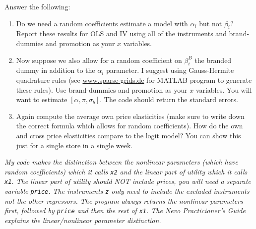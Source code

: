 \documentclass[11pt,letterpaper]{article}
\begin{document}
\noindent Answer the following:
\begin{enumerate}
\item Do we need a random coefficients estimate a model with $\alpha_i$ but not $\beta_i$? Report these results for OLS and IV using all of the instruments and brand-dummies and promotion as your $x$ variables.
\item Now suppose we also allow for a random coefficient on $\beta_i^{B}$ the branded dummy in addition to the $\alpha_i$ parameter. I suggest using Gauss-Hermite quadrature rules (see \url{www.sparse-grids.de} for MATLAB program to generate these rules). Use brand-dummies and promotion as your $x$ variables. You will want to estimate $[\alpha, \pi, \sigma_b]$. The code should return the standard errors.
\item Again compute the average own price elasticities (make sure to write down the correct formula which allows for random coefficients). How do the own and cross price elasticities compare to the logit model? You can show this just for a single store in a single week.
\end{enumerate}
\textit{My code makes the distinction between the nonlinear parameters (which have random coefficients) which it calls \texttt{x2} and the linear part of utility which it calls \texttt{x1}. The linear part of utility should NOT include prices, you will need a separate variable \texttt{price}. The instruments \texttt{z} only need to include the excluded instruments not the other regressors. The program always returns the nonlinear parameters first, followed by  \texttt{price} and then the rest of \texttt{x1}. The Nevo Practicioner's Guide explains the linear/nonlinear parameter distinction.} 
\end{document}
